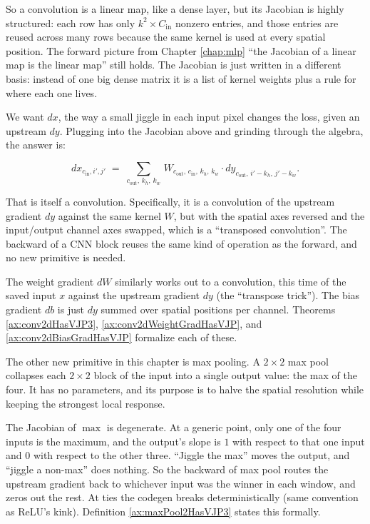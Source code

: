 So a convolution is a linear map, like a dense layer, but its
Jacobian is highly structured: each row has only \(k^2 \times C_{\text{in}}\)
nonzero entries, and those entries are reused across many rows
because the same kernel is used at every spatial position. The
forward picture from Chapter \ref{chap:mlp} ``the Jacobian of a
linear map is the linear map'' still holds. The Jacobian is just
written in a different basis: instead of one big dense matrix it
is a list of kernel weights plus a rule for where each one lives.


We want \(dx\), the way a small jiggle in each input pixel changes
the loss, given an upstream \(dy\). Plugging into the Jacobian above and grinding through the
algebra, the answer is:

\[
dx_{c_{\text{in}}, i', j'}
\;=\;
\sum_{c_{\text{out}},\, k_h,\, k_w}\,
W_{c_{\text{out}},\, c_{\text{in}},\, k_h,\, k_w}
\cdot
dy_{c_{\text{out}},\, i' - k_h,\, j' - k_w}.
\]

That is itself a convolution. Specifically, it is a convolution
of the upstream gradient \(dy\) against the same kernel \(W\),
but with the spatial axes reversed and the input/output
channel axes swapped, which is a ``transposed convolution''.
The backward of a CNN block reuses the same kind of operation as the
forward, and no new primitive is needed.

The weight gradient \(dW\) similarly works out to a convolution,
this time of the saved input \(x\) against the upstream gradient
\(dy\) (the ``transpose trick''). The bias gradient \(db\) is just
\(dy\) summed over spatial positions per channel. Theorems
\ref{ax:conv2dHasVJP3}, \ref{ax:conv2dWeightGradHasVJP}, and
\ref{ax:conv2dBiasGradHasVJP} formalize each of these.


The other new primitive in this chapter is max pooling. A
\(2 \times 2\) max pool collapses each \(2 \times 2\) block of the
input into a single output value: the max of the four. It has no
parameters, and its purpose is to halve the spatial resolution while
keeping the strongest local response.

The Jacobian of \(\max\) is degenerate. At a generic point, only one
of the four inputs is the maximum, and the output's slope is \(1\)
with respect to that one input and \(0\) with respect to the
other three. ``Jiggle the max'' moves the output, and ``jiggle a
non-max'' does nothing. So the backward of max pool routes the
upstream gradient back to whichever input was the winner in each
window, and zeros out the rest. At ties the codegen breaks
deterministically (same convention as ReLU's kink). Definition
\ref{ax:maxPool2HasVJP3} states this formally.

